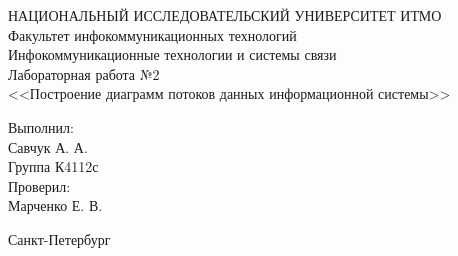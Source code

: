 \begin{titlepage}

  \begin{center}
    НАЦИОНАЛЬНЫЙ ИССЛЕДОВАТЕЛЬСКИЙ УНИВЕРСИТЕТ ИТМО\\[0.1cm]
    Факультет инфокоммуникационных технологий\\
    Инфокоммуникационные технологии и системы связи\\[5cm]

    {\Large Лабораторная работа №2}\\[0.1cm]
    \noindent<<Построение диаграмм потоков данных информационной системы>>\\[3cm]
  \end{center}

  \begin{minipage}{0.65\linewidth}
    \hspace{\fill}
  \end{minipage}
  \begin{minipage}{0.25\linewidth}
    Выполнил:\\
    Савчук А. А.\\
    Группа К4112с \\

    Проверил:\\
    Марченко Е. В.
  \end{minipage}

  \vfill

  \begin{center}
    Санкт-Петербург\\
    \the\year
  \end{center}

\end{titlepage}
